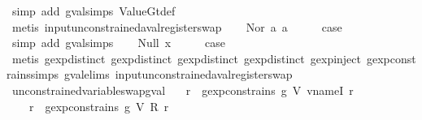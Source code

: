 \begin{isabellebody}
\ {\isacharparenleft}simp\ add{\isacharcolon}\ gval{\isachardot}simps\ ValueGt{\isacharunderscore}def{\isacharparenright}\isanewline
\ \ \ \ \isamarkupfalse%
\ {\isacharparenleft}metis\ input{\isacharunderscore}unconstrained{\isacharunderscore}aval{\isacharunderscore}register{\isacharunderscore}swap{\isacharparenright}\isanewline
{}\isamarkupfalse%
\isanewline
\ \ \isamarkupfalse%
\ {\isacharparenleft}Nor\ a{}\ a{}{\isacharparenright}\isanewline
\ \ \isamarkupfalse%
\ \isamarkupfalse%
\ {\isacharquery}case\isanewline
\ \ \ \ \isamarkupfalse%
\ {\isacharparenleft}simp\ add{\isacharcolon}\ gval{\isachardot}simps{\isacharparenleft}{}{\isacharparenright}{\isacharparenright}\isanewline
{}\isamarkupfalse%
\isanewline
\ \ \isamarkupfalse%
\ {\isacharparenleft}Null\ x{\isacharparenright}\isanewline
\ \ \isamarkupfalse%
\ \isamarkupfalse%
\ {\isacharquery}case\isanewline
\ \ \ \ \isamarkupfalse%
\ {\isacharparenleft}metis\ gexp{\isachardot}distinct{\isacharparenleft}{}{}{\isacharparenright}\ gexp{\isachardot}distinct{\isacharparenleft}{}{}{\isacharparenright}\ gexp{\isachardot}distinct{\isacharparenleft}{}{}{\isacharparenright}\ gexp{\isachardot}distinct{\isacharparenleft}{}{\isacharparenright}\ gexp{\isachardot}inject{\isacharparenleft}{}{\isacharparenright}\ gexp{\isacharunderscore}constrains{\isachardot}simps{\isacharparenleft}{}{\isacharparenright}\ gval{\isachardot}elims\ input{\isacharunderscore}unconstrained{\isacharunderscore}aval{\isacharunderscore}register{\isacharunderscore}swap{\isacharparenright}\isanewline
{}\isamarkupfalse%
%
\endisatagproof
{\isafoldproof}%
%
\isadelimproof
\isanewline
%
\endisadelimproof
\isanewline
{}\isamarkupfalse%
\ unconstrained{\isacharunderscore}variable{\isacharunderscore}swap{\isacharunderscore}gval{\isacharcolon}\isanewline
\ \ \ {\isachardoublequoteopen}{\isasymforall}r{\isachardot}\ {\isasymnot}\ gexp{\isacharunderscore}constrains\ g\ {\isacharparenleft}V\ {\isacharparenleft}vname{\isachardot}I\ r{\isacharparenright}{\isacharparenright}\ {\isasymLongrightarrow}\isanewline
\ \ \ \ {\isasymforall}r{\isachardot}\ {\isasymnot}\ gexp{\isacharunderscore}constrains\ g\ {\isacharparenleft}V\ {\isacharparenleft}R\ r{\isacharparenright}{\isacharparenright}\ {\isasymLongrightarrow}\isanewline

\end{isabellebody}
